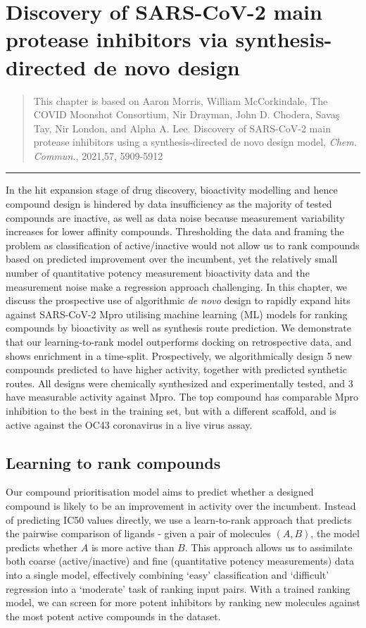 \chapter{Discovery of SARS-CoV-2 main protease inhibitors via synthesis-directed de novo design} \label{ch:ranking}

\begin{quote}
 This chapter is based on Aaron Morris, William McCorkindale, The COVID Moonshot Consortium, Nir Drayman, John D. Chodera, Savaş Tay, Nir London, and Alpha A. Lee. Discovery of SARS-CoV-2 main protease inhibitors using a synthesis-directed de novo design model, \textit{Chem. Commun.}, 2021,57, 5909-5912 
\end{quote}

\noindent\hfil\rule{0.5\textwidth}{.4pt}\hfil

In the hit expansion stage of drug discovery, bioactivity modelling and hence compound design is hindered by data insufficiency as the majority of tested compounds are inactive, as well as data noise because measurement variability increases for lower affinity compounds. Thresholding the data and framing the problem as classification of active/inactive would not allow us to rank compounds based on predicted improvement over the incumbent, yet the relatively small number of quantitative potency measurement bioactivity data and the measurement noise make a regression approach challenging. In this chapter, we discuss the prospective use of algorithmic \emph{de novo} design to rapidly expand hits against SARS-CoV-2 Mpro utilising machine learning (ML) models for ranking compounds by bioactivity as well as synthesis route prediction. We demonstrate that our learning-to-rank model outperforms docking on retrospective data, and shows enrichment in a time-split. Prospectively, we algorithmically design 5 new compounds predicted to have higher activity, together with predicted synthetic routes. All designs were chemically synthesized and experimentally tested, and 3 have measurable activity against Mpro. The top compound has comparable Mpro inhibition to the best in the training set, but with a different scaffold, and is active against the OC43 coronavirus in a live virus assay.

\section{Learning to rank compounds}
Our compound prioritisation model aims to predict whether a designed compound is likely to be an improvement in activity over the incumbent. Instead of predicting IC50 values directly, we use a learn-to-rank approach \cite{duffy2010molecular,agarwal2010ranking} that predicts the pairwise comparison of ligands - given a pair of molecules $(A, B)$, the model predicts whether $A$ is more active than $B$. This approach allows us to assimilate both coarse (active/inactive) and fine (quantitative potency measurements) data into a single model, effectively combining `easy' classification and `difficult' regression into a `moderate' task of ranking input pairs. With a trained ranking model, we can screen for more potent inhibitors by ranking new molecules against the most potent active compounds in the dataset.

